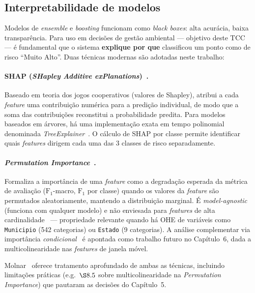 \subsection{Interpretabilidade de modelos}
\label{sec:fund_interpretabilidade}

Modelos de \emph{ensemble} e \emph{boosting} funcionam como \emph{black boxes}: alta acurácia, baixa transparência. Para uso em decisões de gestão ambiental --- objetivo deste TCC --- é fundamental que o sistema \textbf{explique por que} classificou um ponto como de risco ``Muito Alto''. Duas técnicas modernas são adotadas neste trabalho:

\paragraph{SHAP (\emph{SHapley Additive exPlanations})~\cite{lundberg2017unified}.} Baseado em teoria dos jogos cooperativos (valores de Shapley), atribui a cada \emph{feature} uma contribuição numérica para a predição individual, de modo que a soma das contribuições reconstitui a probabilidade predita. Para modelos baseados em árvores, há uma implementação exata em tempo polinomial denominada \emph{TreeExplainer}~\cite{lundberg2020local}. O cálculo de SHAP por classe permite identificar quais \emph{features} dirigem cada uma das 3 classes de risco separadamente.

\paragraph{\emph{Permutation Importance}~\cite{breiman2001random,fisher2019all}.} Formaliza a importância de uma \emph{feature} como a degradação esperada da métrica de avaliação (\(\text{F}_1\)-macro, \(\text{F}_1\) por classe) quando os valores da \emph{feature} são permutados aleatoriamente, mantendo a distribuição marginal. É \emph{model-agnostic} (funciona com qualquer modelo) e não enviesada para \emph{features} de alta cardinalidade~\cite{strobl2007bias} --- propriedade relevante quando há OHE de variáveis como \texttt{Municipio} (542 categorias) ou \texttt{Estado} (9 categorias). A análise complementar via importância \emph{condicional}~\cite{hooker2021unrestricted} é apontada como trabalho futuro no Capítulo~6, dada a multicolinearidade nas \emph{features} de janela móvel.

Molnar~\cite{molnar2022interpretable} oferece tratamento aprofundado de ambas as técnicas, incluindo limitações práticas (e.g.\ \(\S 8.5\) sobre multicolinearidade na \emph{Permutation Importance}) que pautaram as decisões do Capítulo~5.

